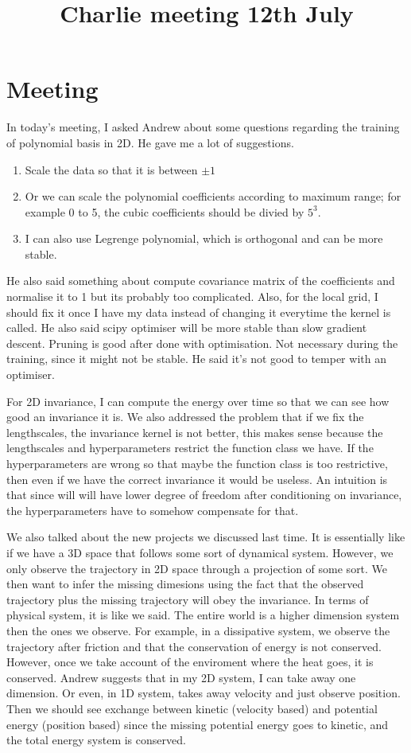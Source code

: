 \documentclass{article}
\title{\vspace{-3cm}Charlie meeting 12th July\vspace{-3em}}
\author{}
\date{}
\begin{document}
\maketitle
\section*{Meeting}
In today's meeting, I asked Andrew about some questions regarding the training of polynomial basis in 2D.
He gave me a lot of suggestions.
\begin{enumerate}
  \item Scale the data so that it is between $\pm 1$
  \item Or we can scale the polynomial coefficients according to maximum range; for example 0 to 5, the cubic coefficients should be divied by $5^3.$
  \item I can also use Legrenge polynomial, which is orthogonal and can be more stable.
\end{enumerate}
He also said something about compute covariance matrix of the coefficients and normalise it to 1 but its probably too complicated. 
Also, for the local grid, I should fix it once I have my data instead of changing it everytime the kernel is called. 
He also said scipy optimiser will be more stable than slow gradient descent.
Pruning is good after done with optimisation. Not necessary during the training, since it might not be stable. 
He said it's not good to temper with an optimiser. 

For 2D invariance, I can compute the energy over time so that we can see how good an invariance it is. 
We also addressed the problem that if we fix the lengthscales, the invariance kernel is not better, this makes sense because the lengthscales and hyperparameters restrict the function class we have. 
If the hyperparameters are wrong so that maybe the function class is too restrictive, then even if we have the correct invariance it would be useless. 
An intuition is that since will will have lower degree of freedom after conditioning on invariance, the hyperparameters have to somehow compensate for that.

We also talked about the new projects we discussed last time.
It is essentially like if we have a 3D space that follows some sort of dynamical system. However, we only observe the trajectory in 2D space through a projection of some sort. 
We then want to infer the missing dimesions using the fact that the observed trajectory plus the missing trajectory will obey the invariance. 
In terms of physical system, it is like we said. 
The entire world is a higher dimension system then the ones we observe. 
For example, in a dissipative system, we observe the trajectory after friction and that the conservation of energy is not conserved. 
However, once we take account of the enviroment where the heat goes, it is conserved. 
Andrew suggests that in my 2D system, I can take away one dimension. 
Or even, in 1D system, takes away velocity and just observe position. Then we should see exchange between kinetic (velocity based) and potential energy (position based) since the missing potential energy goes to kinetic, and the total energy system is conserved.
\end{document}
